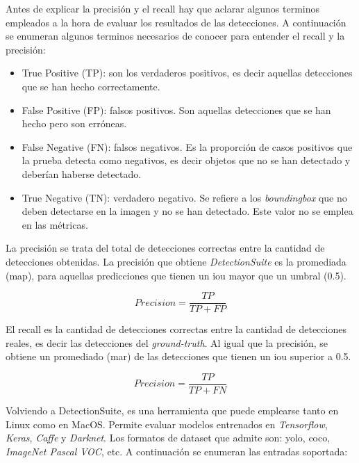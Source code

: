 Antes de explicar la precisión y el recall hay que aclarar algunos terminos empleados a la hora de evaluar los resultados de las detecciones. A continuación se enumeran algunos terminos necesarios de conocer para entender el recall y la precisión:

\begin{itemize}
    \item True Positive (TP): son los verdaderos positivos, es decir aquellas detecciones que se han hecho correctamente.
    \item False Positive (FP): falsos positivos. Son aquellas detecciones que se han hecho pero son erróneas.
    \item False Negative (FN): falsos negativos. Es la proporción de casos positivos que la prueba detecta como negativos, es decir objetos que no se han detectado y deberían haberse detectado.
    \item True Negative (TN): verdadero negativo. Se refiere a los \textit{boundingbox} que no deben detectarse en la imagen y no se han detectado. Este valor no se emplea en las métricas.
\end{itemize}

La precisión se trata del total de detecciones correctas entre la cantidad de detecciones obtenidas. La precisión que obtiene \textit{DetectionSuite} es la promediada (\acrfull{map}), para aquellas predicciones que tienen un \acrshort{iou} mayor que un umbral (0.5).

\begin{equation}\label{precision}
Precision = \frac{TP}{TP + FP}
\end{equation}

El recall es la cantidad de detecciones correctas entre la cantidad de detecciones reales, es decir las detecciones del \textit{ground-truth}. Al igual que la precisión, se obtiene un promediado (\acrfull{mar}) de las detecciones que tienen un \acrshort{iou} superior a 0.5.

\begin{equation}\label{recall}
Precision = \frac{TP}{TP + FN}
\end{equation}

Volviendo a DetectionSuite, es una herramienta que puede emplearse tanto en Linux como en MacOS. Permite evaluar modelos entrenados en \textit{Tensorflow}, \textit{Keras}, \textit{Caffe} y \textit{Darknet}. Los formatos de dataset que admite son:  \acrshort{yolo}, \acrshort{coco}, \textit{ImageNet Pascal VOC}, etc. A continuación se enumeran las entradas soportada:

